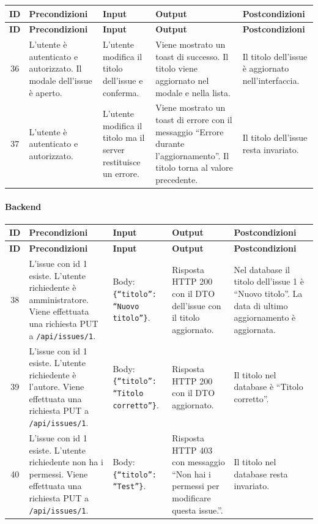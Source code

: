 {
\small
\begin{longtable}{|c|p{3.8cm}|p{3.8cm}|p{3.8cm}|p{3.8cm}|}
\hline
\textbf{ID} & \textbf{Precondizioni} & \textbf{Input} & \textbf{Output} & \textbf{Postcondizioni} \\
\hline
\endfirsthead
\hline
\textbf{ID} & \textbf{Precondizioni} & \textbf{Input} & \textbf{Output} & \textbf{Postcondizioni} \\
\hline
\endhead
36 &
L'utente \`e autenticato e autorizzato. Il modale dell'issue \`e aperto. &
L'utente modifica il titolo dell'issue e conferma. &
Viene mostrato un toast di successo. Il titolo viene aggiornato nel modale e nella lista. &
Il titolo dell'issue \`e aggiornato nell'interfaccia. \\
\hline
37 &
L'utente \`e autenticato e autorizzato. &
L'utente modifica il titolo ma il server restituisce un errore. &
Viene mostrato un toast di errore con il messaggio ``Errore durante l'aggiornamento''. Il titolo torna al valore precedente. &
Il titolo dell'issue resta invariato. \\
\hline
\end{longtable}
}

\paragraph{Backend}

{
\small
\begin{longtable}{|c|p{3.8cm}|p{3.8cm}|p{3.8cm}|p{3.8cm}|}
\hline
\textbf{ID} & \textbf{Precondizioni} & \textbf{Input} & \textbf{Output} & \textbf{Postcondizioni} \\
\hline
\endfirsthead
\hline
\textbf{ID} & \textbf{Precondizioni} & \textbf{Input} & \textbf{Output} & \textbf{Postcondizioni} \\
\hline
\endhead
38 &
L'issue con id 1 esiste. L'utente richiedente \`e amministratore. Viene effettuata una richiesta PUT a \texttt{/api/issues/1}. &
Body: \texttt{\{``titolo'': ``Nuovo titolo''\}}. &
Risposta HTTP 200 con il DTO dell'issue con il titolo aggiornato. &
Nel database il titolo dell'issue 1 \`e ``Nuovo titolo''. La data di ultimo aggiornamento \`e aggiornata. \\
\hline
39 &
L'issue con id 1 esiste. L'utente richiedente \`e l'autore. Viene effettuata una richiesta PUT a \texttt{/api/issues/1}. &
Body: \texttt{\{``titolo'': ``Titolo corretto''\}}. &
Risposta HTTP 200 con il DTO aggiornato. &
Il titolo nel database \`e ``Titolo corretto''. \\
\hline
40 &
L'issue con id 1 esiste. L'utente richiedente non ha i permessi. Viene effettuata una richiesta PUT a \texttt{/api/issues/1}. &
Body: \texttt{\{``titolo'': ``Test''\}}. &
Risposta HTTP 403 con messaggio ``Non hai i permessi per modificare questa issue.''. &
Il titolo nel database resta invariato. \\
\hline
\end{longtable}
}

